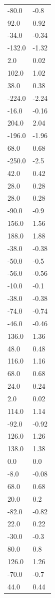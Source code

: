 \begin{longtable}{ll}
-80.0 & -0.8 \\
92.0 & 0.92 \\
-34.0 & -0.34 \\
-132.0 & -1.32 \\
2.0 & 0.02 \\
102.0 & 1.02 \\
38.0 & 0.38 \\
-224.0 & -2.24 \\
-16.0 & -0.16 \\
204.0 & 2.04 \\
-196.0 & -1.96 \\
68.0 & 0.68 \\
-250.0 & -2.5 \\
42.0 & 0.42 \\
28.0 & 0.28 \\
28.0 & 0.28 \\
-90.0 & -0.9 \\
156.0 & 1.56 \\
188.0 & 1.88 \\
-38.0 & -0.38 \\
-50.0 & -0.5 \\
-56.0 & -0.56 \\
-10.0 & -0.1 \\
-38.0 & -0.38 \\
-74.0 & -0.74 \\
-46.0 & -0.46 \\
136.0 & 1.36 \\
48.0 & 0.48 \\
116.0 & 1.16 \\
68.0 & 0.68 \\
24.0 & 0.24 \\
2.0 & 0.02 \\
114.0 & 1.14 \\
-92.0 & -0.92 \\
126.0 & 1.26 \\
138.0 & 1.38 \\
0.0 & 0.0 \\
-8.0 & -0.08 \\
68.0 & 0.68 \\
20.0 & 0.2 \\
-82.0 & -0.82 \\
22.0 & 0.22 \\
-30.0 & -0.3 \\
80.0 & 0.8 \\
126.0 & 1.26 \\
-70.0 & -0.7 \\
44.0 & 0.44 \\

\end{longtable}
